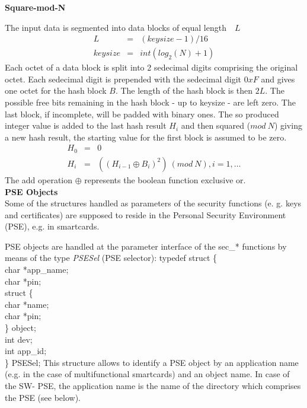 {\bf Square-mod-N}

\noindent
The input data is segmented into data blocks of equal length~~$L$
\begin{eqnarray*}
	 L	& = & (keysize-1)/16 \\
	keysize & = & int(log_2(N)+1)
\end{eqnarray*}
\noindent
Each octet of a data block is split into 2 sedecimal digits comprising
the original octet. Each sedecimal digit is prepended with the sedecimal 
digit
$0xF$ and gives one octet for the hash block $B$. The length of the hash 
block
is then $2L$.
The possible free bits remaining in the hash block - up to keysize - are 
left zero.
The last block, if incomplete, will be padded with binary ones.
The so produced integer value is added to the last hash result $H_i$
and then squared ($mod ~N$) giving a new hash result, the starting value
for the first block is assumed to be zero.
\begin{eqnarray*}
	H_0 & = & 0	\\
	H_i & = & (( H_{i-1} \oplus B_i )^2) ~(mod ~N), i = 1, \ldots
\end{eqnarray*}
The add operation $\oplus$ represents the boolean function exclusive or.
\\ [1em]
{\bf PSE Objects}
\\ [1em]
Some of the structures handled as parameters of the security functions (e. 
g. keys and certificates)
are supposed to reside in the Personal Security Environment (PSE), e.g. in 
smartcards.

PSE objects are handled at the parameter interface of the sec\_* functions 
by means of the type
{\em PSESel} (PSE selector):
{\small
\btab
\2 typedef struct \{ \\
\3      char  \1  *app\_name; \\
\3      char  \1  *pin;      \\
\3      struct \{            \\
\4         char *name;       \\
\4         char *pin;        \\
\3      \}    \1 object;     \\
\3      int    \1  dev;      \\
\3      int    \1  app\_id;   \\
\2 \} PSESel;
\etab
}
This structure allows to identify a PSE object by an application name (e.g. 
in the
case of multifunctional smartcards) and an object name. In case of the SW-
PSE, the
application name is the name of the directory which comprises the PSE (see 
below).

